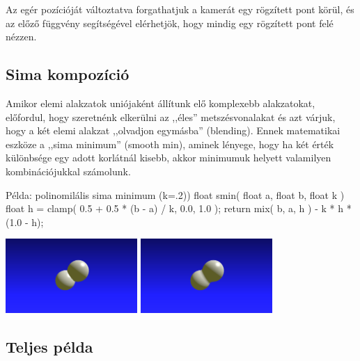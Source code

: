 
Az egér pozícióját változtatva forgathatjuk a kamerát egy rögzített pont körül,
és az előző függvény segítségével elérhetjök, hogy mindig egy rögzített pont felé nézzen.


\subsection{Sima kompozíció}

Amikor elemi alakzatok uniójaként állítunk elő komplexebb alakzatokat, előfordul, hogy
szeretnénk elkerülni az ,,éles'' metszésvonalakat és azt várjuk, hogy a két elemi alakzat
,,olvadjon egymásba'' (blending). Ennek matematikai eszköze a ,,sima minimum'' (smooth min),
aminek lényege, hogy ha két érték különbsége egy adott korlátnál kisebb, akkor minimumuk helyett
valamilyen kombinációjukkal számolunk.

\begin{glsl}{Példa: polinomilális sima minimum (k=.2))}
float smin( float a, float b, float k )
{
  float h = clamp( 0.5 + 0.5 * (b - a) / k, 0.0, 1.0 );
  return mix( b, a, h ) - k * h * (1.0 - h);
}
\end{glsl}


\begin{center}
  \hfill
  \includegraphics[width=5cm]{images/uni-min.png}\hfill
  \includegraphics[width=5cm]{images/uni-smin.png}\hfill~
  \end{center}

\subsection{Teljes példa}

